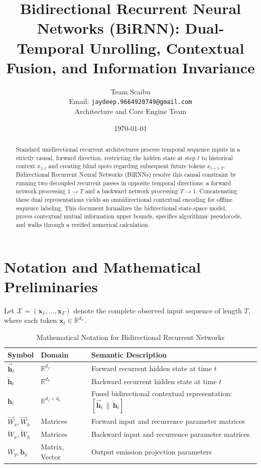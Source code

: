 \documentclass[11pt,a4paper]{article}
\title{Bidirectional Recurrent Neural Networks (BiRNN): Dual-Temporal Unrolling, Contextual Fusion, and Information Invariance}
\author{Team Scaibu \\ \small Email: \texttt{jaydeep.9664920749@gmail.com} \\ \small Architecture and Core Engine Team}
\date{\today}
\theoremstyle{definition}
\begin{document}
\maketitle

\begin{abstract}
Standard unidirectional recurrent architectures process temporal sequence inputs in a strictly causal, forward direction, restricting the hidden state at step $t$ to historical context $x_{1:t}$ and creating blind spots regarding subsequent future tokens $x_{t+1:T}$. Bidirectional Recurrent Neural Networks (BiRNNs) resolve this causal constraint by running two decoupled recurrent passes in opposite temporal directions: a forward network processing $1 \to T$ and a backward network processing $T \to 1$. Concatenating these dual representations yields an omnidirectional contextual encoding for offline sequence labeling. This document formalizes the bidirectional state-space model, proves contextual mutual information upper bounds, specifies algorithmic pseudocode, and walks through a verified numerical calculation.
\end{abstract}

\section{Notation and Mathematical Preliminaries}

Let $\mathcal{X} = (\mathbf{x}_1, \dots, \mathbf{x}_T)$ denote the complete observed input sequence of length $T$, where each token $\mathbf{x}_t \in \mathbb{R}^{d_x}$.

\begin{table}[h]
\centering
\caption{Mathematical Notation for Bidirectional Recurrent Networks}
\begin{tabular}{lll}
\toprule
\textbf{Symbol} & \textbf{Domain} & \textbf{Semantic Description} \\
\midrule
$\overrightarrow{\mathbf{h}}_t$ & $\mathbb{R}^{d_f}$ & Forward recurrent hidden state at time $t$ \\
$\overleftarrow{\mathbf{h}}_t$ & $\mathbb{R}^{d_b}$ & Backward recurrent hidden state at time $t$ \\
$\mathbf{h}_t$ & $\mathbb{R}^{d_f + d_b}$ & Fused bidirectional contextual representation: $[\overrightarrow{\mathbf{h}}_t \,\|\, \overleftarrow{\mathbf{h}}_t]$ \\
$\overrightarrow{W}_x, \overrightarrow{W}_h$ & Matrices & Forward input and recurrence parameter matrices \\
$\overleftarrow{W}_x, \overleftarrow{W}_h$ & Matrices & Backward input and recurrence parameter matrices \\
$W_y, \mathbf{b}_y$ & Matrix, Vector & Output emission projection parameters \\
\bottomrule
\end{tabular}
\end{table}
\end{document}
